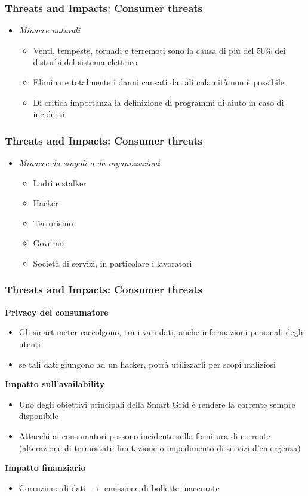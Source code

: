 
\begin{frame}
  \frametitle{Threats and Impacts: Consumer threats}
  \begin{itemize}[<+- | alert@+>]
  \item \textit{Minacce naturali}
	\begin{itemize}
	\item Venti, tempeste, tornadi e terremoti sono la causa di più del 50\% dei disturbi del sistema elettrico
	\item Eliminare totalmente i danni causati da tali calamità non è possibile
	\item Di critica importanza la definizione di programmi di aiuto in caso di incidenti
	\end{itemize}
  \end{itemize}
\end{frame}

\begin{frame}
  \frametitle{Threats and Impacts: Consumer threats}
  \begin{itemize}[<+- | alert@+>]
  \item \textit{Minacce da singoli o da organizzazioni}
	\begin{itemize}
	\item Ladri e stalker
	\item Hacker
	\item Terrorismo
	\item Governo
	\item Società di servizi, in particolare i lavoratori
	\end{itemize}
  \end{itemize}
\end{frame}


\begin{frame}
  \frametitle{Threats and Impacts: Consumer threats}
	\textbf{Privacy del consumatore}
		\begin{itemize}
		\item Gli smart meter raccolgono, tra i vari dati, anche informazioni personali degli utenti
		\item se tali dati giungono ad un hacker, potrà utilizzarli per scopi maliziosi
		\end{itemize}
	\textbf{Impatto sull'availability}
			\begin{itemize}
		\item Uno degli obiettivi principali della Smart Grid è rendere la corrente sempre disponibile
		\item Attacchi ai consumatori possono incidente sulla fornitura di corrente (alterazione di termostati, limitazione o impedimento di servizi d'emergenza) 
		\end{itemize}
	\textbf{Impatto finanziario}
				\begin{itemize}
		\item Corruzione di dati $\rightarrow$ emissione di bollette inaccurate
		\end{itemize}
\end{frame}

